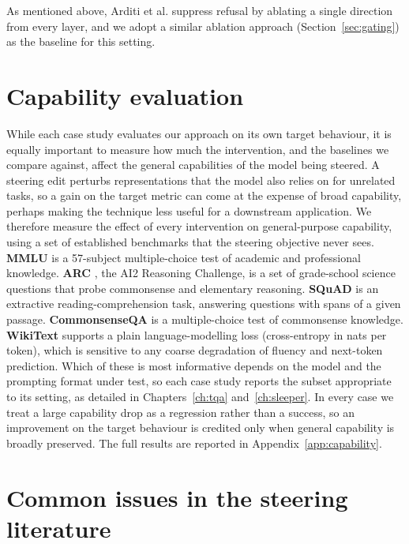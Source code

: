 \documentclass[logo,msc,notimes]{infthesis}
\begin{document}
As mentioned above, Arditi et al. \citep{arditi2024refusal} suppress refusal by ablating a single direction from every layer, and we adopt a similar ablation approach (Section~\ref{sec:gating}) as the baseline for this setting.

\section{Capability evaluation}\label{sec:capability}

While each case study evaluates our approach on its own target behaviour, it is equally important to
measure how much the intervention, and the baselines we compare against, affect the general
capabilities of the model being steered. A steering edit perturbs representations that the model also
relies on for unrelated tasks, so a gain on the target metric can come at the expense of broad
capability, perhaps making the technique less useful for a downstream application. We therefore
measure the effect of every intervention on general-purpose capability, using a set of established
benchmarks that the steering objective never sees. \textbf{MMLU} \citep{hendrycks2021mmlu} is a
57-subject multiple-choice test of academic and professional knowledge. \textbf{ARC}
\citep{clark2018arc}, the AI2 Reasoning Challenge, is a set of grade-school science questions that
probe commonsense and elementary reasoning. \textbf{SQuAD} \citep{rajpurkar2018squad} is an extractive reading-comprehension task, answering
questions with spans of a given passage. \textbf{CommonsenseQA} \citep{talmor2019commonsenseqa} is
a multiple-choice test of commonsense knowledge. \textbf{WikiText} \citep{merity2017wikitext}
supports a plain language-modelling loss (cross-entropy in nats per token), which is sensitive to any
coarse degradation of fluency and next-token prediction. Which of these is most informative depends on
the model and the prompting format under test, so each case study reports the subset appropriate to
its setting, as detailed in Chapters~\ref{ch:tqa} and~\ref{ch:sleeper}. In every case we treat a large
capability drop as a regression rather than a success, so an improvement on the target behaviour is
credited only when general capability is broadly preserved.
The full results are reported in Appendix~\ref{app:capability}.

\section{Common issues in the steering literature}\label{sec:steering-issues}
\end{document}
